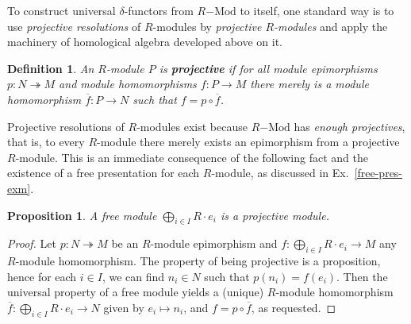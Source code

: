 \documentclass{amsart}
\theoremstyle{plain}
\numberwithin{equation}{section} %
\numberwithin{figure}{section} %
\theoremstyle{plain}
\theoremstyle{plain}
\theoremstyle{plain}
\theoremstyle{plain}
\theoremstyle{plain}
\newtheorem{prop}[thm]{Proposition} %
\theoremstyle{plain}
\newtheorem{Def}[thm]{Definition} %
\theoremstyle{remark}
\theoremstyle{remark}
\theoremstyle{remark}
\begin{document}
To construct universal $\delta$-functors from $R\mathrm{-Mod}$ to itself, one standard way is to use \textit{projective resolutions} of $R$-modules by \textit{projective $R$-modules} and apply the machinery of homological algebra developed above on it.

\begin{Def}
An $R$-module $P$ is \textbf{projective} if for all module epimorphisms $p : N \twoheadrightarrow M$ and module homomorphisms $f: P \rightarrow M$ there merely is a module homomorphism $\overline{f}: P \rightarrow N$ such that $f = p \circ \overline{f}$.
\end{Def}  

Projective resolutions of $R$-modules exist because $R\mathrm{-Mod}$ has \textit{enough projectives}, that is, to every $R$-module there merely exists an epimorphism from a projective $R$-module. This is an immediate consequence of the following fact and the existence of a free presentation for each $R$-module, as discussed in Ex.~\ref{free-pres-exm}.
\begin{prop}
A free module $\bigoplus_{i \in I} R \cdot e_i$ is a projective module.
\end{prop}
\begin{proof}
Let $p : N \twoheadrightarrow M$ be an $R$-module epimorphism and $f : \bigoplus_{i \in I} R \cdot e_i \rightarrow M$ any $R$-module homomorphism. The property of being projective is a proposition, hence for each $i \in I$, we can find $n_i \in N$ such that $p(n_i) = f(e_i)$. Then the universal property of a free module yields a (unique) $R$-module homomorphism $\overline{f} : \bigoplus_{i \in I} R \cdot e_i \rightarrow N$ given by $e_i \mapsto n_i$, and $f = p \circ \overline{f}$, as requested. 
\end{proof}
\end{document}
